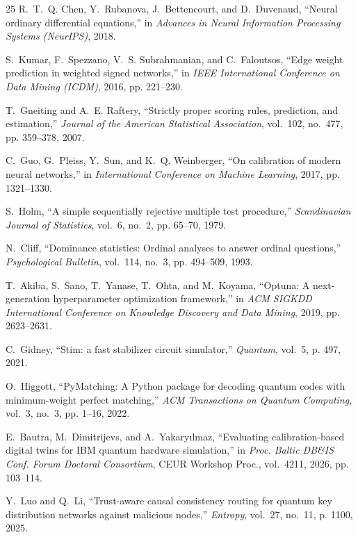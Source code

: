 \documentclass[journal]{IEEEtran}
\begin{document}
\begin{thebibliography}{25}
R.~T.~Q. Chen, Y.~Rubanova, J.~Bettencourt, and D.~Duvenaud, ``Neural ordinary
  differential equations,'' in \emph{Advances in Neural Information Processing Systems
  (NeurIPS)}, 2018.

S.~Kumar, F.~Spezzano, V.~S. Subrahmanian, and C.~Faloutsos, ``Edge weight
  prediction in weighted signed networks,'' in \emph{IEEE International Conference on Data
  Mining (ICDM)}, 2016, pp. 221--230.

T.~Gneiting and A.~E. Raftery, ``Strictly proper scoring rules, prediction, and
  estimation,'' \emph{Journal of the American Statistical Association}, vol.~102, no.~477, pp.
  359--378, 2007.

C.~Guo, G.~Pleiss, Y.~Sun, and K.~Q. Weinberger, ``On calibration of modern
  neural networks,'' in \emph{International Conference on Machine Learning}, 2017, pp.
  1321--1330.

S.~Holm, ``A simple sequentially rejective multiple test procedure,''
  \emph{Scandinavian Journal of Statistics}, vol.~6, no.~2, pp. 65--70, 1979.

N.~Cliff, ``Dominance statistics: Ordinal analyses to answer ordinal
  questions,'' \emph{Psychological Bulletin}, vol.~114, no.~3, pp. 494--509, 1993.

T.~Akiba, S.~Sano, T.~Yanase, T.~Ohta, and M.~Koyama, ``{Optuna}: A
  next-generation hyperparameter optimization framework,'' in \emph{ACM SIGKDD International Conference on Knowledge Discovery and Data Mining}, 2019, pp. 2623--2631.

C.~Gidney, ``{Stim}: a fast stabilizer circuit simulator,'' \emph{Quantum},
  vol.~5, p. 497, 2021.

O.~Higgott, ``{PyMatching}: A {P}ython package for decoding quantum codes with
  minimum-weight perfect matching,'' \emph{ACM Transactions on Quantum Computing}, vol.~3,
  no.~3, pp. 1--16, 2022.

E.~Bautra, M.~Dimitrijevs, and A.~Yakary{\i}lmaz, ``Evaluating calibration-based
  digital twins for {IBM} quantum hardware simulation,'' in \emph{Proc. Baltic DB\&IS
  Conf. Forum Doctoral Consortium}, CEUR Workshop Proc., vol.~4211, 2026, pp. 103--114.

Y.~Luo and Q.~Li, ``Trust-aware causal consistency routing for quantum key
  distribution networks against malicious nodes,'' \emph{Entropy}, vol.~27,
  no.~11, p. 1100, 2025.


\end{thebibliography}
\end{document}
